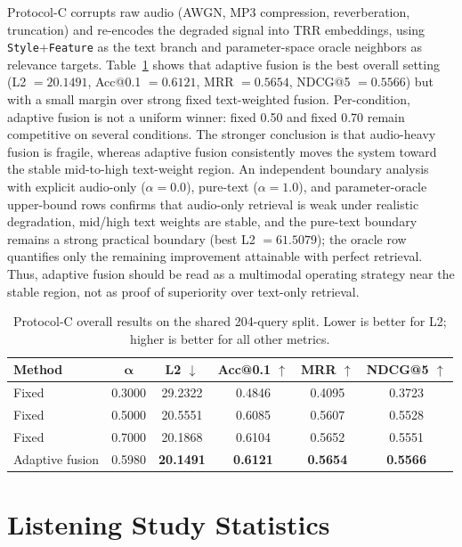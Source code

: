 \documentclass[journal,10pt]{IEEEtran}
\begin{document}
Protocol-C corrupts raw audio (AWGN, MP3 compression, reverberation, truncation) and re-encodes the degraded signal into TRR embeddings, using \texttt{Style}+\texttt{Feature} as the text branch and parameter-space oracle neighbors as relevance targets. Table~\ref{tab:protocolC_summary} shows that adaptive fusion is the best overall setting (L2 $=20.1491$, Acc@0.1 $=0.6121$, MRR $=0.5654$, NDCG@5 $=0.5566$) but with a small margin over strong fixed text-weighted fusion. Per-condition, adaptive fusion is not a uniform winner: fixed 0.50 and fixed 0.70 remain competitive on several conditions. The stronger conclusion is that audio-heavy fusion is fragile, whereas adaptive fusion consistently moves the system toward the stable mid-to-high text-weight region. An independent boundary analysis with explicit audio-only ($\alpha=0.0$), pure-text ($\alpha=1.0$), and parameter-oracle upper-bound rows confirms that audio-only retrieval is weak under realistic degradation, mid/high text weights are stable, and the pure-text boundary remains a strong practical boundary (best L2 $=61.5079$); the oracle row quantifies only the remaining improvement attainable with perfect retrieval. Thus, adaptive fusion should be read as a multimodal operating strategy near the stable region, not as proof of superiority over text-only retrieval.

\begin{table}[t]
	\centering
	\caption{Protocol-C overall results on the shared 204-query split. Lower is better for L2; higher is better for all other metrics.}
	\label{tab:protocolC_summary}
	\footnotesize
	\begin{tabular}{lccccc}
		\toprule
		\textbf{Method} & $\boldsymbol{\alpha}$ & \textbf{L2} $\downarrow$ & \textbf{Acc@0.1} $\uparrow$ & \textbf{MRR} $\uparrow$ & \textbf{NDCG@5} $\uparrow$ \\
		\midrule
		Fixed & 0.3000 & 29.2322 & 0.4846 & 0.4095 & 0.3723 \\
		Fixed & 0.5000 & 20.5551 & 0.6085 & 0.5607 & 0.5528 \\
		Fixed & 0.7000 & 20.1868 & 0.6104 & 0.5652 & 0.5551 \\
		Adaptive fusion & 0.5980 & \textbf{20.1491} & \textbf{0.6121} & \textbf{0.5654} & \textbf{0.5566} \\
		\bottomrule
	\end{tabular}
\end{table}

\section{Listening Study Statistics}
\end{document}

